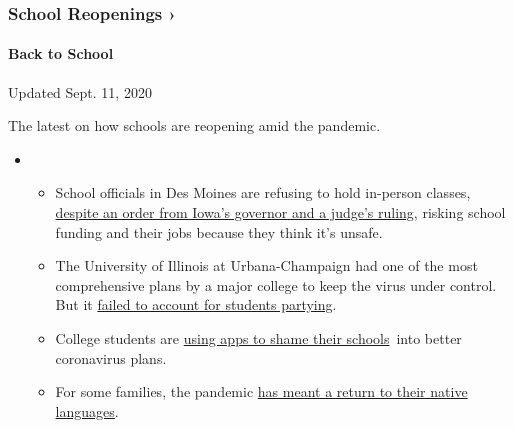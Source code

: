 \hypertarget{school-reopenings-}{%
\subsubsection{School Reopenings ›}\label{school-reopenings-}}

\hypertarget{back-to-school}{%
\paragraph{Back to School}\label{back-to-school}}

Updated Sept. 11, 2020

The latest on how schools are reopening amid the pandemic.

\begin{itemize}
\item
  \begin{itemize}
  \tightlist
  \item
    School officials in Des Moines are refusing to hold in-person
    classes,
    \href{https://www.nytimes3xbfgragh.onion/2020/09/10/us/des-moines-school-opening-coronavirus.html?action=click\&pgtype=Article\&state=default\&region=MAIN_CONTENT_3\&context=storylines_keepup}{despite
    an order from Iowa's governor and a judge's ruling}, risking school
    funding and their jobs because they think it's unsafe.
  \item
    The University of Illinois at Urbana-Champaign had one of the most
    comprehensive plans by a major college to keep the virus under
    control. But it
    \href{https://www.nytimes3xbfgragh.onion/2020/09/10/health/university-illinois-covid.html?action=click\&pgtype=Article\&state=default\&region=MAIN_CONTENT_3\&context=storylines_keepup}{failed
    to account for students partying}.
  \item
    College students are
    \href{https://www.nytimes3xbfgragh.onion/2020/09/10/technology/coronavirus-quarantines-college.html?action=click\&pgtype=Article\&state=default\&region=MAIN_CONTENT_3\&context=storylines_keepup}{using
    apps to shame their schools}~into better coronavirus plans.
  \item
    For some families, the pandemic
    \href{https://www.nytimes3xbfgragh.onion/2020/09/10/parenting/family-second-language-coronavirus.html?action=click\&pgtype=Article\&state=default\&region=MAIN_CONTENT_3\&context=storylines_keepup}{has
    meant a return to their native languages}.
  \end{itemize}
\end{itemize}

